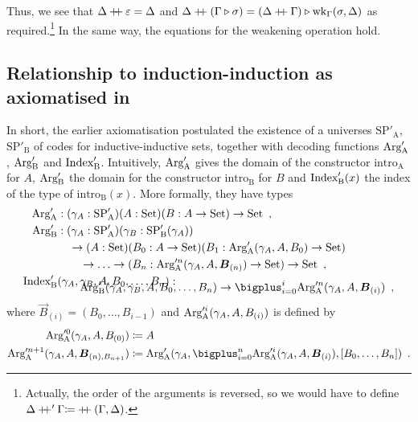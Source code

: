 \documentclass[orivec,envcountsame, ,envcountsect]{llncs}
\begin{document}
Thus, we see that $\Delta \mathbin{+\mkern-6mu+} \varepsilon = \Delta$ and $\Delta
\mathbin{+\mkern-6mu+} (\Gamma \triangleright \sigma) = (\Delta
  \mathbin{+\mkern-6mu+} \Gamma) \triangleright \text{wk}_{\Gamma}(\sigma, \Delta)$ as
required.\footnote{Actually, the order of the arguments is reversed,
  so we would have to define \\$\Delta \mathbin{+\mkern-6mu+}' \Gamma {\coloneqq}
  \mathbin{+\mkern-6mu+}(\Gamma, \Delta)$.} In the same way, the equations for
the weakening operation hold.


\subsection{Relationship to induction-induction as axiomatised in \cite{nordvallforsbergSetzer2010indind}} %
\label{sec:functors-CSL-article}

In short, the earlier
axiomatisation \cite{nordvallforsbergSetzer2010indind} postulated the
existence of a universes $\text{SP}'_{\text{A}}$,
$\text{SP}'_{\text{B}}$ of codes for inductive-inductive sets,
together with decoding functions $\text{Arg}_{\text{A}}'$, $\text{Arg}_{\text{B}}'$ and
$\text{Index}'_{\text{B}}$. Intuitively, $\text{Arg}_{\text{A}}'$ gives the domain of the
constructor $\text{intro}_{\text{A}}$ for $A$, $\text{Arg}_{\text{B}}'$ the domain
for the constructor $\text{intro}_{\text{B}}$ for $B$ and
$\text{Index}'_{\text{B}}(x)$ the index of the type of $\text{intro}_{\text{B}}(x)$. More formally, they have types
\begin{align*}
\CSLArgA &: (\gamma_A : \text{SP}'_{\text{A}})(A : \Set)(B : A \to \Set) \to \Set \enspace ,\\
\CSLArgB &: (\gamma_A : \text{SP}'_{\text{A}})(\gamma_B : \text{SP}'_{\text{B}}(\gamma_A)) \\
       & \quad \to (A : \Set)(B_0 : A \to \Set)(B_1 : \CSLArgA(\gamma_A, A, B_0) \to \Set) \\
       & \qquad \to \ldots \to (B_n : \CSLArgA^n(\gamma_A, A, \vec{B}_{(n)}) \to \Set) \to \Set \enspace , \\
\CSLIndex&(\gamma_A, \gamma_B, A, B_0, \ldots, B_n) : \\ \noalign{\vskip -4mm}
              &  \qquad \CSLArgB(\gamma_A, \gamma_B, A, B_0, \ldots, B_n) \to \bigplus_{i = 0}^i \CSLArgA^n(\gamma_A, A, \vec{B}_{(i)}) \enspace ,
\end{align*} 
where $\vec{B}_{(i)} = (B_0, \ldots, B_{i - 1})$ and $\text{Arg}_{\text{A}}'^i(\gamma_A, A, B_{(i)})$ is defined by
\begin{align*}
  \CSLArgA^0(\gamma_A, A, B_{(0)}) &\coloneqq A \\
  \CSLArgA^{n + 1}(\gamma_A, A, \vec{B}_{(n), B_{n + 1}}) &\coloneqq \CSLArgA(\gamma_A, \bigplus_{i = 0}^n \CSLArgA^i(\gamma_A, A, \vec{B}_{(i)}), \coprodmorph{B_0, \ldots}{B_n}) \enspace .
\end{align*}
\end{document}
